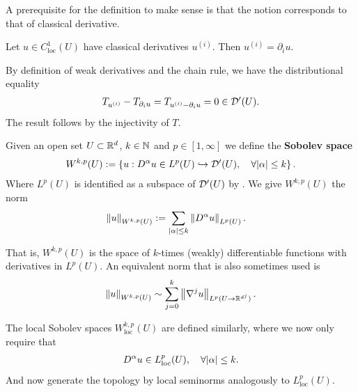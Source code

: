 \documentclass[
    a4paper,
    DIV=14,
    abstract=true,
    numbers=noenddot
]{scrartcl}
\begin{document}
A prerequisite for the definition to make sense is that the notion corresponds to that of classical derivative.
\begin{exercise} Let $u \in C_{\mathrm{loc}}^1(U)$ have classical derivatives $u^{(i)}$. Then $u^{(i)}= \partial_i u $.
\end{exercise}
\begin{hint}
	By definition of weak derivatives and the chain rule, we have the distributional equality
	\begin{align*}
		T_{u^{(i)}}-T_{\partial _i u}=T_{u^{(i)}-\partial _i u}=0 \in \mathcal{D}'(U)   .
	\end{align*}
	The result follows by the injectivity of $T$.
\end{hint}
\begin{definition}\label{sobolev def}
	Given an open set $U \subset \mathbb{R}^d$, $k \in \mathbb{N}$ and $p \in [1,\infty]$  we define the \textbf{Sobolev space}
	\begin{align*}
		W^{k,p}(U):=\left\{ u: D^{\alpha}u \in L^p(U) \hookrightarrow \mathcal{D}'(U), \quad\forall {\left| \alpha \right|}\leq k   \right\} .
	\end{align*}
	Where $L^p(U)$ is identified as a subspace of  $\mathcal{D}'(U)$ by . We give $W^{k,p}(U)$ the norm
	\begin{align*}
		\left\lVert u \right\rVert_{W^{k,p}(U)}&:=\sum_{{\left| \alpha \right|}\leq k } \left\lVert D^\alpha u \right\rVert_{L^p(U)}.        \end{align*}
\end{definition}
That is, $W^{k,p}(U)$ is the space of $k$-times (weakly) differentiable functions with derivatives in $L^p(U)$. An equivalent norm that is also sometimes used is
\begin{align*}
	\left\lVert u \right\rVert_{W^{k,p}(U)}\sim \sum_{j=0}^k \left\lVert \nabla^j u \right\rVert_{L^p(U\to \mathbb{R}^{d^j})} .
\end{align*}



The local Sobolev spaces $W^{k,p}_{\mathrm{loc}}(U)$ are defined similarly, where we now only require that
\begin{align*}
	D^\alpha u \in L^p_{\text{loc}}(U) , \quad\forall {\left| \alpha \right|}\leq k .
\end{align*}
And now generate the topology by local seminorms analogously to $L^p_{\mathrm{loc}}(U)$.
\end{document}
